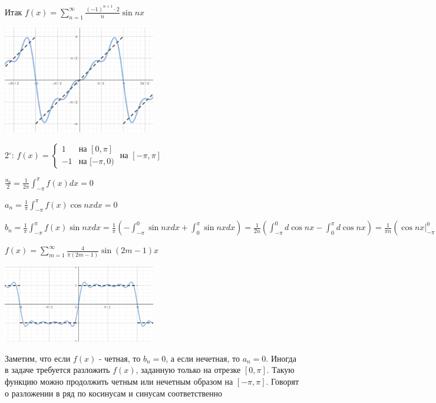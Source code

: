 \documentclass[12pt]{article}
\begin{document}
    Итак $f(x) = \sum_{n = 1}^\infty \frac{(-1)^{n + 1} \cdot 2}{n} \sin nx$

    \begin{center}
        \includegraphics[width=0.5\textwidth]{addchapters1/images/addchapters1_2024_11_15_1}
    \end{center}

    2$^\circ$: $f(x) = \begin{cases}1 & \text{на } [0, \pi] \\ -1 & \text{на } [-\pi, 0)\end{cases}$ на $[-\pi, \pi]$

    $\frac{a_0}{2} = \frac{1}{2\pi} \int_{-\pi}^\pi f(x) dx = 0$

    $a_n = \frac{1}{\pi} \int_{-\pi}^\pi f(x) \cos nx dx = 0$

    $b_n = \frac{1}{\pi} \int_{-\pi}^\pi f(x) \sin nx dx = \frac{1}{\pi} \left(-\int_{-\pi}^0 \sin nx dx + \int_0^\pi \sin nx dx\right) = 
    \frac{1}{2n} \left(\int_{-\pi}^0 d\cos nx - \int_0^\pi d\cos nx\right) = \frac{1}{\pi n} \left(\cos nx \Big|_{-\pi}^0 - \cos nx \Big|_0^\pi\right) = 
    \frac{1}{\pi n} (1 - \cos \pi n - \cos \pi n + 1) = \frac{2}{\pi n}(1 - \cos \pi n) = \frac{4}{\pi (2m - 1)}$

    $f(x) = \sum_{m = 1}^\infty \frac{4}{\pi (2m - 1)} \sin (2m - 1) x$

    \begin{center}
        \includegraphics[width=0.5\textwidth]{addchapters1/images/addchapters1_2024_11_15_2}
    \end{center}

    \Nota Заметим, что если $f(x)$ - четная, то $b_n = 0$, а если нечетная, то $a_n = 0$. Иногда в задаче
    требуется разложить $f(x)$, заданную только на отрезке $[0, \pi]$. Такую функцию можно продолжить четным
    или нечетным образом на $[-\pi, \pi]$. Говорят о разложении в ряд по косинусам и синусам соответственно
\end{document}
